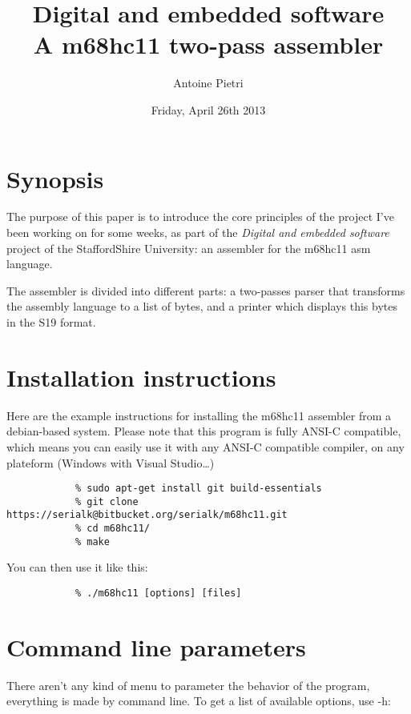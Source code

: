 \documentclass[a4paper,11pt]{article}
\title{Digital and embedded software\\A m68hc11 two-pass assembler}
\author{Antoine Pietri}
\date{Friday, April 26th 2013}
\begin{document}
    \expandafter\def\csname PY@tok@err\endcsname{}
    \maketitle
    \tableofcontents

    \newpage
    \section{Synopsis}

        The purpose of this paper is to introduce the core principles of the
        project I've been working on for some weeks, as part of the
        \emph{Digital and embedded software} project of the StaffordShire
        University: an assembler for the m68hc11 asm language.

        The assembler is divided into different parts: a two-passes parser that
        transforms the assembly language to a list of bytes, and a printer
        which displays this bytes in the S19 format.

    \section{Installation instructions}

        Here are the example instructions for installing the m68hc11 assembler
        from a debian-based system. Please note that this program is fully
        ANSI-C compatible, which means you can easily use it with any ANSI-C
        compatible compiler, on any plateform (Windows with Visual
        Studio\ldots)
        
        \begin{verbatim}
            % sudo apt-get install git build-essentials
            % git clone https://serialk@bitbucket.org/serialk/m68hc11.git
            % cd m68hc11/
            % make
        \end{verbatim}

        You can then use it like this:

        \begin{verbatim}
            % ./m68hc11 [options] [files]
        \end{verbatim}

    \section{Command line parameters}

        There aren't any kind of menu to parameter the behavior of the program,
        everything is made by command line. To get a list of available options,
        use -h:
\end{document}
